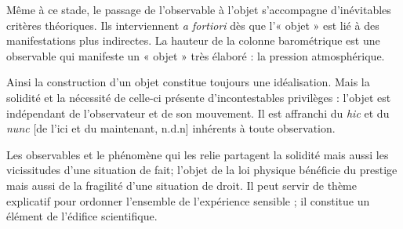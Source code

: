 Même à ce stade, le passage de l’observable à l’objet s’accompagne
d’inévitables critères théoriques. Ils interviennent {\it a fortiori} dès que
l’« objet » est lié à des manifestations plus indirectes. La hauteur de la
colonne barométrique est une observable qui manifeste un « objet » très
élaboré : la pression atmosphérique.

Ainsi la construction d’un objet constitue toujours une idéalisation.
Mais la solidité et la nécessité de celle-ci présente d’incontestables privilèges :
l’objet est indépendant de l’observateur et de son mouvement. Il
est affranchi du {\it hic} et du {\it nunc}
{\footnotesize [de l'ici et du maintenant, n.d.n]}
inhérents à toute observation.

Les observables et le phénomène qui les relie partagent la solidité
mais aussi les vicissitudes d’une situation de fait; l’objet de la loi physique
bénéficie du prestige mais aussi de la fragilité d’une situation de
droit. Il peut servir de thème explicatif pour ordonner l’ensemble de
l’expérience sensible
;
il constitue un élément de l’édifice scientifique.

